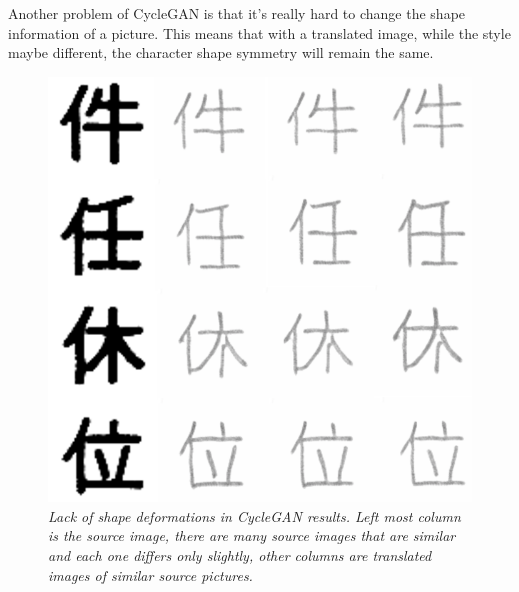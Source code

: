 \documentclass[12pt]{report}
\begin{document}
Another problem of CycleGAN is that it's really hard to change the shape information of a picture. This means that with a translated image, while the style maybe different, the character shape symmetry will remain the same.

\begin{figure}[h]
	\centering
	\includegraphics[scale=0.9]{cycle-gan-result-2}
	\caption{\textit{Lack of shape deformations in CycleGAN results. Left most column is the source image, there are many source images that are similar and each one differs only slightly, other columns are translated images of similar source pictures.}}
	\label{fig:cycle-gan-result-2}
\end{figure}
\end{document}
